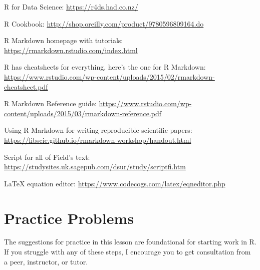 \documentclass[
  11pt,
]{book}
\begin{document}
R for Data Science: \url{https://r4ds.had.co.nz/}

R Cookbook: \url{http://shop.oreilly.com/product/9780596809164.do}

R Markdown homepage with tutorials: \url{https://rmarkdown.rstudio.com/index.html}

R has cheatsheets for everything, here's the one for R Markdown: \url{https://www.rstudio.com/wp-content/uploads/2015/02/rmarkdown-cheatsheet.pdf}

R Markdown Reference guide: \url{https://www.rstudio.com/wp-content/uploads/2015/03/rmarkdown-reference.pdf}

Using R Markdown for writing reproducible scientific papers: \url{https://libscie.github.io/rmarkdown-workshop/handout.html}

Script for all of Field's text: \url{https://studysites.uk.sagepub.com/dsur/study/scriptfi.htm}

LaTeX equation editor: \url{https://www.codecogs.com/latex/eqneditor.php}

\hypertarget{practice-problems}{%
\section{Practice Problems}\label{practice-problems}}

The suggestions for practice in this lesson are foundational for starting work in R. If you struggle with any of these steps, I encourage you to get consultation from a peer, instructor, or tutor.
\end{document}
